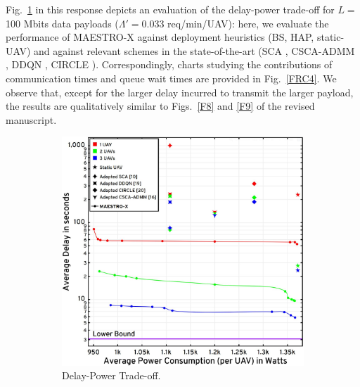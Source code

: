 \documentclass[12pt, draftcls, onecolumn]{IEEEtran}
\theoremstyle{plain}
\theoremstyle{definition}
\theoremstyle{remark}
\begin{document}
\begin{enumerate}
    Fig.~\ref{FRC3} in this response depicts an evaluation of the delay-power trade-off for $L{=}$100 Mbits data payloads ($\Lambda'{=}$0.033 req/min/UAV): here, we evaluate the performance of MAESTRO-X against deployment heuristics (BS, HAP, static-UAV) and against relevant schemes in the state-of-the-art (SCA \cite{SCA}, CSCA-ADMM \cite{CSCA-ADMM}, DDQN \cite{DDQN}, CIRCLE \cite{MEC-DDPG}). Correspondingly, charts studying the contributions of communication times and queue wait times are provided in Fig.~\ref{FRC4}. We observe that, except for the larger delay incurred to transmit the larger payload, the results are qualitatively similar to Figs.~\ref{F8} and \ref{F9} of the revised manuscript.
    \begin{figure} [t]
         \begin{subfigure}{0.53\linewidth}
             \centering
             \includegraphics[width=1.0\linewidth]{figs/Delay_Power_100Mb_Scatter_Low_Congestion.jpg}
             \caption{Delay-Power Trade-off.}
             \label{FRC3}
         \end{subfigure}
         \hfill
         \begin{subfigure}{0.455\linewidth}
             \centering

\end{subfigure}
\end{figure}
\end{enumerate}
\end{document}
